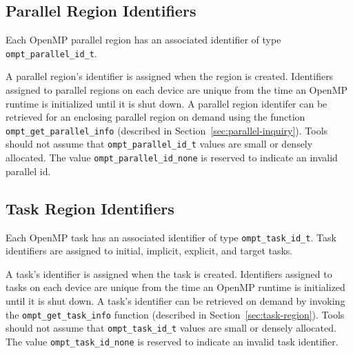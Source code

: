 \documentclass{article}
\begin{document}
\subsection{Parallel Region Identifiers}
  Each OpenMP parallel region has an associated identifier of type
  \verb|ompt_parallel_id_t|. 

\noindent
  A parallel region's identifier is assigned
  when the region is created.  Identifiers assigned to parallel regions on each device are unique from the time an 
  OpenMP runtime is initialized until it is shut down. 
  A parallel region identifer can be retrieved for an enclosing parallel region
  on demand using the function \verb|ompt_get_parallel_info|  (described in Section~\ref{sec:parallel-inquiry}).
  Tools should not assume that \verb|ompt_parallel_id_t| values are small or densely allocated.
  The value \verb|ompt_parallel_id_none| is reserved to indicate an invalid parallel id.
 
 
  \subsection{Task Region Identifiers}
  Each OpenMP task has an associated identifier of type
  \verb|ompt_task_id_t|. Task identifiers are assigned to
   initial, implicit, explicit, and target tasks.

  A task's identifier is assigned
  when the task is created. 
  Identifiers assigned to tasks on each device are unique from the time an 
  OpenMP runtime is initialized until it is shut down. 
  A task's identifier can be retrieved
  on demand by invoking the \verb|ompt_get_task_info|  function (described in Section~\ref{sec:task-region}).
  Tools should not assume that \verb|ompt_task_id_t| values are small or densely allocated. 
  The value \verb|ompt_task_id_none| is reserved to indicate an invalid task identifier.
  
\end{document}
